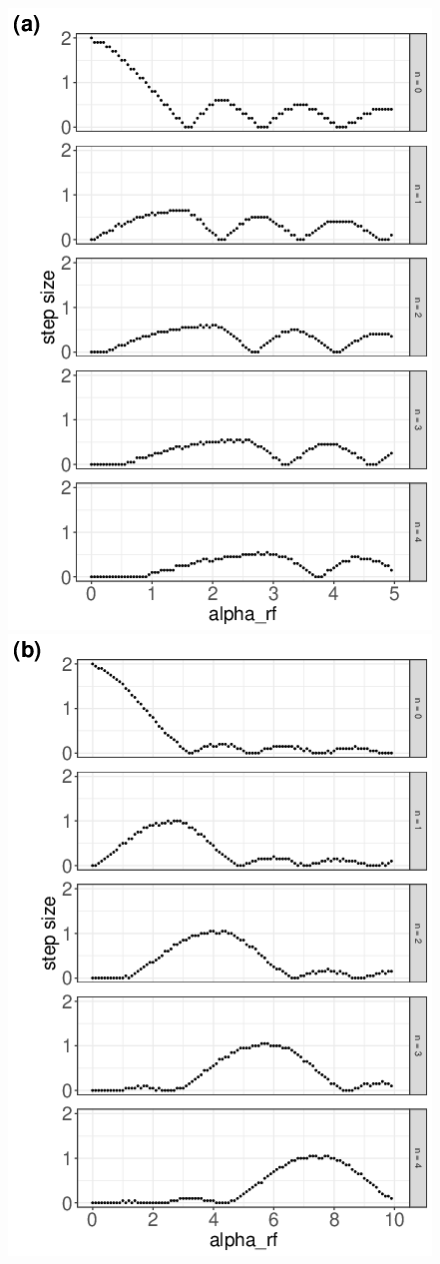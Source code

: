 \begin{figure}[!p]
	\centering
	\includegraphics[width = 0.45 \textwidth]{images/SINGLE2.png}
	\includegraphics[width = 0.45 \textwidth]{images/PULS0250.png}
\end{figure}
